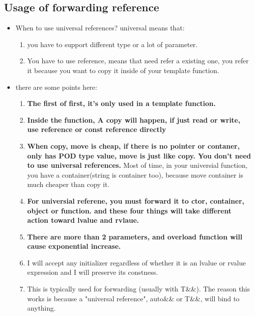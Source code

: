 \documentclass[a4paper,11pt,twoside]{book}
\begin{document}
\subsection{Usage of forwarding reference}
\begin{itemize}
\item When to use universal references? universal means that:
\begin{enumerate}
	\item you have to support different type or a lot of parameter. 
	\item You have to use reference, means that need refer a existing one, you refer it because you want to copy it inside of your template function. 
\end{enumerate}

\item there are some points here:
	\begin{enumerate}
		\item \textbf{The first of first, it's only used in a template function.}
		
		\item \textbf{Inside the function, A copy will happen, if just read or write, use reference or const reference directly}
		
		\item \textbf{When copy, move is cheap, if there is no pointer or contaner, only has POD type value, move is just like copy. You don't need to use universal references.} Most of time, in your universial function, you have a container(string is container too), because move container is much cheaper than copy it.
		
		\item \textbf{For universial referene, you must forward it to ctor, container, object or function. and these four things will take different action toward lvalue and rvlaue.}
		
		\item \textbf{There are more than 2 parameters, and overload function will cause exponential increase.}

		\item I will accept any initializer regardless of whether it is an lvalue or rvalue expression and I will preserve its constness. 

		\item This is typically used for forwarding (usually with T\&\&). The reason this works is because a "universal reference", auto\&\& or T\&\&, will bind to anything.  


\end{enumerate}
\end{itemize}
\end{document}
